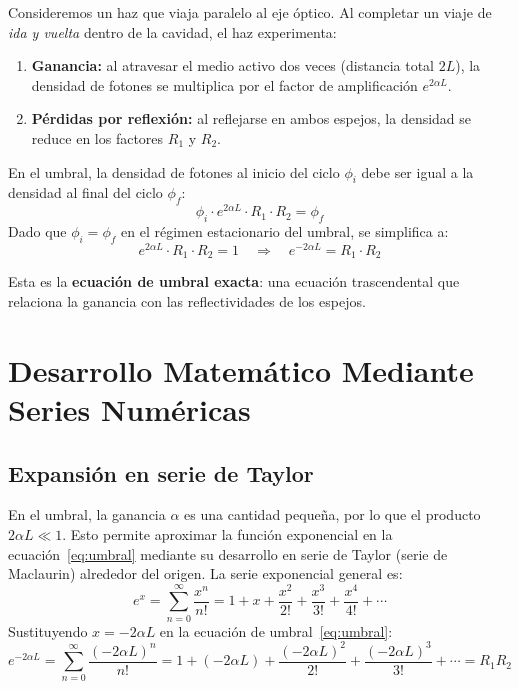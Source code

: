 \documentclass[12pt, a4paper]{article}
\begin{document}
Consideremos un haz que viaja paralelo al eje óptico. Al completar un viaje de \emph{ida y
vuelta} dentro de la cavidad, el haz experimenta:

\begin{enumerate}[leftmargin=2em]
  \item \textbf{Ganancia:} al atravesar el medio activo dos veces (distancia total $2L$), la
        densidad de fotones se multiplica por el factor de amplificación $e^{2\alpha L}$.
  \item \textbf{Pérdidas por reflexión:} al reflejarse en ambos espejos, la densidad se
        reduce en los factores $R_1$ y $R_2$.
\end{enumerate}

En el umbral, la densidad de fotones al inicio del ciclo $\phi_i$ debe ser igual a la
densidad al final del ciclo $\phi_f$:
%
\begin{equation}
  \phi_i \cdot e^{2\alpha L} \cdot R_1 \cdot R_2 = \phi_f
  \label{eq:umbral_completo}
\end{equation}
%
Dado que $\phi_i = \phi_f$ en el régimen estacionario del umbral, se simplifica a:
%
\begin{equation}
  e^{2\alpha L} \cdot R_1 \cdot R_2 = 1
  \quad\Longrightarrow\quad
  e^{-2\alpha L} = R_1 \cdot R_2
  \label{eq:umbral}
\end{equation}

Esta es la \textbf{ecuación de umbral exacta}: una ecuación trascendental que relaciona la
ganancia con las reflectividades de los espejos.

\section{Desarrollo Matemático Mediante Series Numéricas}

\subsection{Expansión en serie de Taylor}

En el umbral, la ganancia $\alpha$ es una cantidad pequeña, por lo que el producto
$2\alpha L \ll 1$. Esto permite aproximar la función exponencial en la
ecuación~\eqref{eq:umbral} mediante su desarrollo en serie de Taylor (serie de Maclaurin)
alrededor del origen. La serie exponencial general es:
%
\begin{equation}
  e^{x} = \sum_{n=0}^{\infty} \frac{x^n}{n!}
         = 1 + x + \frac{x^2}{2!} + \frac{x^3}{3!} + \frac{x^4}{4!} + \cdots
\end{equation}
%
Sustituyendo $x = -2\alpha L$ en la ecuación de umbral~\eqref{eq:umbral}:
%
\begin{equation}
  e^{-2\alpha L}
  = \sum_{n=0}^{\infty} \frac{(-2\alpha L)^n}{n!}
  = 1 + (-2\alpha L) + \frac{(-2\alpha L)^2}{2!} + \frac{(-2\alpha L)^3}{3!} + \cdots
  = R_1 R_2
  \label{eq:serie_completa}
\end{equation}
\end{document}

